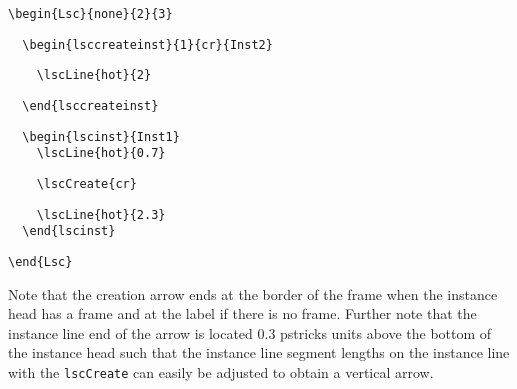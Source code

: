 \documentclass{article}
\newcommand{\bs}{\usebox{\bsbox}}
\newcommand{\cmd}[1]{\bs\texttt{#1}}
\newcommand{\mlscCreate}{\cmd{lscCreate}}
\begin{document}
\begin{center}%
\begin{minipage}{0.435\textwidth}%
\end{minipage}%
\hfill%
\begin{minipage}{0.525\textwidth}%
\small%
{\gray%
\begin{verbatim}
\begin{Lsc}{none}{2}{3}
\end{verbatim}}%
\verbunskip%
\begin{verbatim}
  \begin{lsccreateinst}{1}{cr}{Inst2}
\end{verbatim}%
\verbunskip%
{\gray\begin{verbatim}
    \lscLine{hot}{2}
\end{verbatim}}%
\verbunskip%
\begin{verbatim}
  \end{lsccreateinst}
\end{verbatim}%
\verbunskip%
{\gray\begin{verbatim}
  \begin{lscinst}{Inst1}
    \lscLine{hot}{0.7}
\end{verbatim}}%
\verbunskip%
\begin{verbatim}
    \lscCreate{cr}
\end{verbatim}%
\verbunskip%
{\gray\begin{verbatim}
    \lscLine{hot}{2.3}
  \end{lscinst}
\end{verbatim}}%
\verbunskip%
\begin{verbatim}
\end{Lsc}
\end{verbatim}%
\end{minipage}
\end{center}%>@>

Note that the creation arrow ends at the border of the frame when the instance
head has a frame and at the label if there is no frame.
% 
Further note that the instance line end of the arrow is located 0.3 pstricks
units above the bottom of the instance head such that the instance line
segment lengths on the instance line with the \mlscCreate{} can easily be
adjusted to obtain a vertical arrow.
\end{document}
